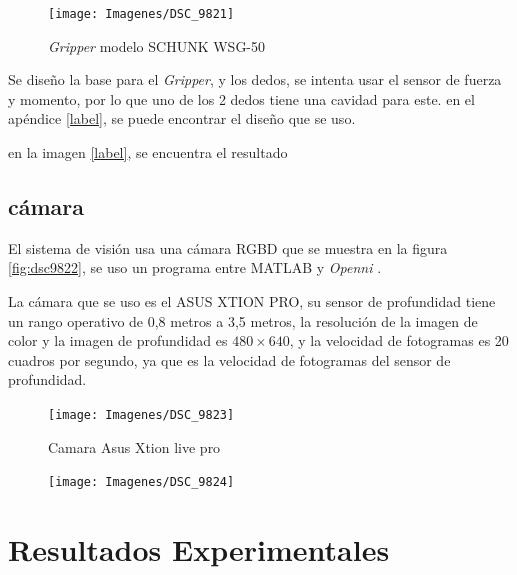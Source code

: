 \begin{figure}
	\centering
	\texttt{[image: Imagenes/DSC\_9821]}
	\caption{\textit{Gripper} modelo SCHUNK WSG-50}
	\label{fig:dsc9821}
\end{figure}


Se diseño la base para el \textit{Gripper}, y los dedos, se intenta usar el sensor de fuerza y momento, por lo que uno de los 2 dedos tiene una cavidad para este. en el apéndice \ref{label}, se puede encontrar el diseño que se uso.

en la imagen \ref{label}, se encuentra el resultado 


\clearpage

\subsection{cámara}

El sistema de visión usa una cámara RGBD que se muestra en la figura \ref{fig:dsc9822}, se uso un programa entre MATLAB y \textit{Openni} \cite{matlabwrapper}.

La cámara que se uso es el ASUS XTION PRO, su sensor de profundidad tiene un rango operativo de 0,8 metros a 3,5 metros, la resolución de la imagen de color y la imagen de profundidad es $480 \times640$, y la velocidad de fotogramas es 20 cuadros por segundo, ya que es la velocidad de fotogramas del sensor de profundidad. \\




\begin{figure}
	\centering
	\texttt{[image: Imagenes/DSC\_9823]}
	\caption{Camara Asus Xtion live pro}
	\label{fig:dsc9823}
\end{figure}
\begin{figure}
	\centering
	\texttt{[image: Imagenes/DSC\_9824]}
	\caption{}
	\label{fig:dsc9824}
\end{figure}

\clearpage




\section{Resultados Experimentales}


